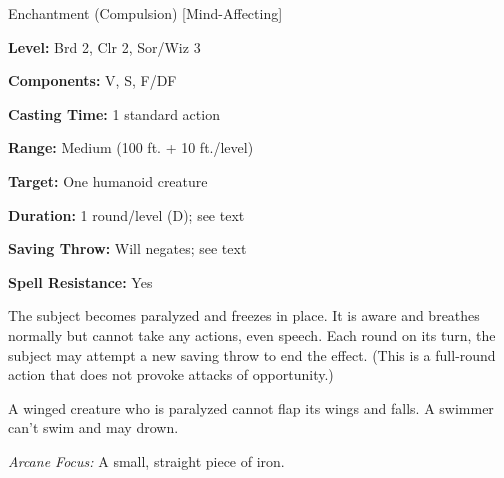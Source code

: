 
Enchantment (Compulsion) [Mind-Affecting]

\textbf{Level:} Brd 2, Clr 2, Sor/Wiz 3

\textbf{Components:} V, S, F/DF

\textbf{Casting Time:} 1 standard action

\textbf{Range:} Medium (100 ft. + 10 ft./level)

\textbf{Target:} One humanoid creature

\textbf{Duration:} 1 round/level (D); see text

\textbf{Saving Throw:} Will negates; see text

\textbf{Spell Resistance:} Yes

The subject becomes paralyzed and freezes in place. It is aware and breathes normally 
but cannot take any actions, even speech. Each round on its turn, the subject may 
attempt a new saving throw to end the effect. (This is a full-round action that 
does not provoke attacks of opportunity.)

A winged creature who is paralyzed cannot flap its wings and falls. A swimmer can't 
swim and may drown.

\textit{Arcane Focus:} A small, straight piece of iron.

